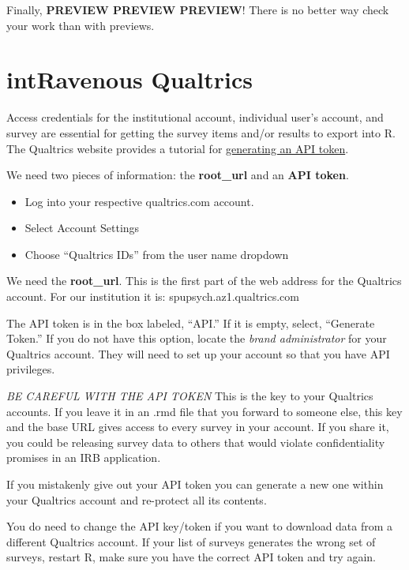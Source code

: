 \documentclass[
  english,
]{book}
\providecommand{\tightlist}{%
  \setlength{\itemsep}{0pt}\setlength{\parskip}{0pt}}
\begin{document}
Finally, \textbf{PREVIEW PREVIEW PREVIEW}! There is no better way check your work than with previews.

\hypertarget{intravenous-qualtrics}{%
\section{intRavenous Qualtrics}\label{intravenous-qualtrics}}

Access credentials for the institutional account, individual user's account, and survey are essential for getting the survey items and/or results to export into R. The Qualtrics website provides a tutorial for \href{https://www.qualtrics.com/support/integrations/api-integration/overview/\#GeneratingAnAPIToken}{generating an API token}.

We need two pieces of information: the \textbf{root\_url} and an \textbf{API token}.

\begin{itemize}
\tightlist
\item
  Log into your respective qualtrics.com account.
\item
  Select Account Settings
\item
  Choose ``Qualtrics IDs'' from the user name dropdown
\end{itemize}

We need the \textbf{root\_url}. This is the first part of the web address for the Qualtrics account. For our institution it is: spupsych.az1.qualtrics.com

The API token is in the box labeled, ``API.'' If it is empty, select, ``Generate Token.'' If you do not have this option, locate the \emph{brand administrator} for your Qualtrics account. They will need to set up your account so that you have API privileges.

\emph{BE CAREFUL WITH THE API TOKEN} This is the key to your Qualtrics accounts. If you leave it in an .rmd file that you forward to someone else, this key and the base URL gives access to every survey in your account. If you share it, you could be releasing survey data to others that would violate confidentiality promises in an IRB application.

If you mistakenly give out your API token you can generate a new one within your Qualtrics account and re-protect all its contents.

You do need to change the API key/token if you want to download data from a different Qualtrics account. If your list of surveys generates the wrong set of surveys, restart R, make sure you have the correct API token and try again.
\end{document}
